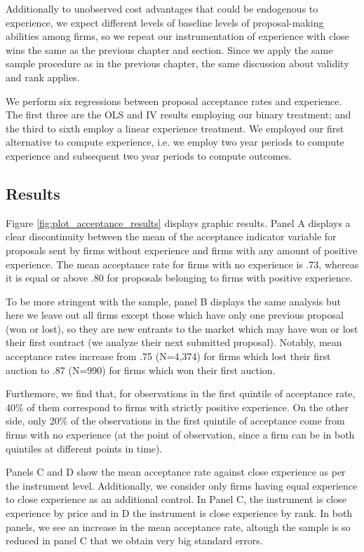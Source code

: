 Additionally to unobserved cost advantages that could be endogenous to experience, we expect different levels of baseline levels of proposal-making abilities among firms, so we repeat our instrumentation of experience with close wins the same as the previous chapter and section. Since we apply the same sample procedure as in the previous chapter, the same discussion about validity and rank applies.

We perform six regressions between proposal acceptance rates and experience. The first three are the OLS and IV results employing our binary treatment; and the third to sixth employ a linear experience treatment. We employed our first alternative to compute experience, i.e. we employ two year periods to compute experience and subsequent two year periods to compute outcomes.

\subsection{Results}
Figure \ref{fig:plot_acceptance_results} displays graphic results. Panel A displays a clear discontinuity between the mean of the acceptance indicator variable for proposals sent by firms without experience and firms with any amount of positive experience. The mean acceptance rate for firms with no experience is .73, whereas it is equal or above .80 for proposals belonging to firms with positive experience.

To be more stringent with the sample, panel B displays the same analysis but here we leave out all firms except those which have only one previous proposal (won or lost), so they are new entrants to the market which may have won or lost their first contract (we analyze their next submitted proposal).  Notably, mean acceptance rates increase from .75 (N=4,374) for firms which lost their first auction to .87 (N=990) for firms which won their first auction.

Furthemore, we find that, for observations in the first quintile of acceptance rate, 40\% of them correspond to firms with strictly positive experience. On the other side, only 20\% of the observations in the first quintile of acceptance come from firms with no experience (at the point of observation, since a firm can be in both quintiles at different points in time).

Panels C and D show the mean acceptance rate against close experience as per the instrument level. Additionally, we consider only firms having equal experience to close experience as an additional control. In Panel C, the instrument is close experience by price and in D the instrument is close experience by rank. In both panels, we see an increase in the mean acceptance rate, altough the sample is so reduced in panel C that we obtain very big standard errors.

